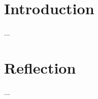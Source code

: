 \documentclass[11pt]{article}
\begin{document}
	

    \renewcommand{\cftsecleader}{\cftdotfill{\cftdotsep}} %
    \tableofcontents
    \thispagestyle{empty}
    \clearpage


    \setcounter{page}{1}

	\section{Introduction} %
		...



    	\section{Reflection}
		...

    \newpage
    
    
    \thispagestyle{plain}
    \clearpage

\end{document}
